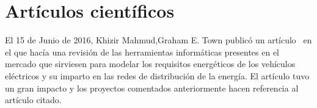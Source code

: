 \section{Artículos científicos}

El 15 de Junio de 2016, Khizir Mahmud,Graham E. Town publicó un artículo~\cite{pdf:articuloAplicacionesRelacionadas} en el que hacía una revisión de las herramientas informáticas presentes en el mercado que sirviesen para modelar los requisitos energéticos de los vehículos eléctricos y su imparto en las redes de distribución de la energía. El artículo tuvo un gran impacto y los proyectos comentados anteriormente hacen referencia al artículo citado. 


